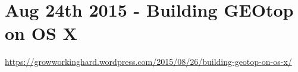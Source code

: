 \section{Aug 24th 2015 - Building GEOtop on OS X}\label{sec:20150824}

\url{https://growworkinghard.wordpress.com/2015/08/26/building-geotop-on-os-x/}








